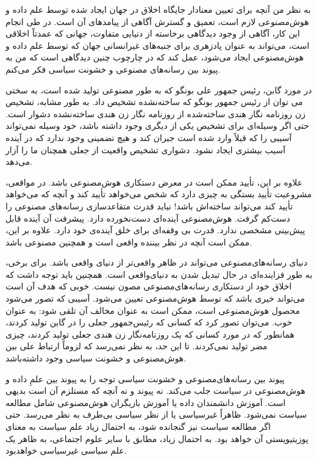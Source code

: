 به نظر من آنچه برای تعیین معنادار جایگاه اخلاق در جهان ایجاد شده توسط علم داده و هوش‌مصنوعی لازم است، تعمیق و گسترش آگاهی از پیامدهای آن است.
در طی انجام این کار، آگاهی از وجود دیدگاهی برخاسته از دنیایی متفاوت، جهانی که عمدتاً اخلاقی است، می‌تواند به عنوان پادزهری برای جنبه‌های غیرانسانی جهان که توسط علم داده و هوش‌مصنوعی ایجاد می‌شود، عمل کند که در چارچوب چنین دیدگاهی است که من به پیوند بین رسانه‌های مصنوعی و خشونت سیاسی فکر می‌کنم.

در مورد گابن، رئیس جمهور علی بونگو که به طور مصنوعی تولید شده است، به سختی می توان از رئیس جمهور بونگو که ساخته‌نشده تشخیص داد.
به طور مشابه، تشخیص زن روزنامه نگار هندی ساخته‌شده از روزنامه نگار زن هندی ساخته‌نشده دشوار است.
حتی اگر وسیله‌ای برای تشخیص یکی از دیگری وجود داشته باشد، خود وسیله نمی‌تواند آسیبی را که قبلاً وارد شده است جبران کند و هیچ تضمینی وجود ندارد که در آینده آسیب بیشتری ایجاد نشود.
دشواری تشخیص واقعیت از جعلی همچنان ما را آزار می‌دهد.

علاوه بر این، تأیید ممکن است در معرض دستکاری هوش‌مصنوعی باشد.
در مواقعی، مشروعیت تأیید بستگی به چیزی دارد که شخص می‌خواهد تأیید کند و آنچه که می‌خواهد تأیید کند می‌تواند ساخته‌اش باشد!
نباید قدرت متقاعدسازی رسانه‌های مصنوعی را دست‌کم گرفت.
هوش‌مصنوعی آینده‌ای دست‌نخورده دارد.
پیشرفت آن آینده قابل پیش‌بینی مشخصی ندارد.
قدرت بی وقفه‌ای برای خلق آینده‌ی خود دارد.
علاوه بر این، ممکن است آنچه در نظر بیننده واقعی است و همچنین مصنوعی باشد.

دنیای رسانه‌های‌مصنوعی می‌تواند در ظاهر واقعی‌تر از دنیای واقعی باشد.
برای برخی، به طور فزاینده‌ای در حال تبدیل شدن به دنیای‌واقعی است.
همچنین باید توجه داشت که اخلاق خود از دستکاری رسانه‌های‌مصنوعی مصون نیست.
خوبی که هدف آن است می‌تواند خیری باشد که توسط هوش‌مصنوعی تعیین می‌شود.
آسیبی که تصور می‌شود محصول هوش‌مصنوعی است، ممکن است به عنوان مخالف آن تلقی شود: به عنوان خوب.
می‌توان تصور کرد که کسانی که رئیس‌جمهور جعلی را در گابن تولید کردند، همانطور که در مورد کسانی که یک روزنامه‌نگار زن هندی جعلی تولید کردند، چیزی مضر تولید نمی‌کردند.
تا این حد، به نظر نمی‌رسد که لزوماً ارتباط علی بین هوش‌مصنوعی و خشونت سیاسی وجود داشته‌باشد.

پیوند بین رسانه‌های‌مصنوعی و خشونت سیاسی توجه را به پیوند بین علمِ داده و هوش‌مصنوعی در سیاست جلب می‌کند.
نه پیوند و نه آنچه که مستلزم آن است بدیهی است.
آموزش دانشمندان داده یا آموزش بازیگران هوش‌مصنوعی شامل مطالعه سیاست نمی‌شود.
ظاهراً غیرسیاسی یا از نظر سیاسی بی‌طرف به نظر می‌رسد.
حتی اگر مطالعه سیاست نیز گنجانده شود، به احتمال زیاد علم سیاست به معنای پوزیتیویستی آن خواهد بود.
به احتمال زیاد، مطابق با سایر علوم اجتماعی، به ظاهر یک علم سیاسی غیرسیاسی خواهد‌بود.

